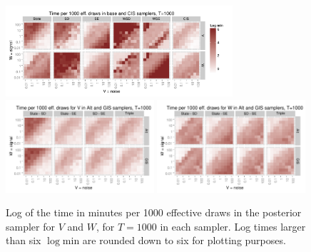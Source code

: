 \documentclass{article}
\begin{document}
\begin{figure}[!h]
\centering
\includegraphics[width=0.75\textwidth]{basecistimeplot1000}
\includegraphics[width=0.49\textwidth]{altgisVtimeplot1000}
\includegraphics[width=0.49\textwidth]{altgisWtimeplot1000}
\caption{Log of the time in minutes per 1000 effective draws in the posterior sampler for $V$ and $W$, for $T=1000$ in each sampler. Log times larger than six $\log \mathrm{min}$ are rounded down to six for plotting purposes.}
\label{baseinttimeplot3}
\end{figure}

\clearpage

\end{document}
